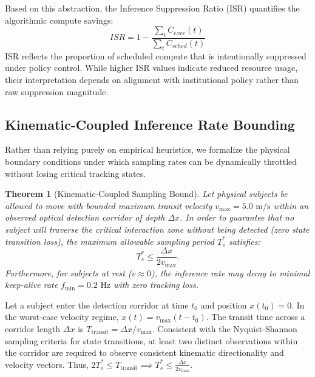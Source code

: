 \documentclass[conference]{IEEEtran}
\newtheorem{theorem}{Theorem}
\begin{document}
Based on this abstraction, the Inference Suppression Ratio (ISR) quantifies the algorithmic compute savings:
\begin{equation}
ISR = 1 - \frac{\sum_t C_{exec}(t)}{\sum_t C_{sched}(t)}
\end{equation}
ISR reflects the proportion of scheduled compute that is intentionally suppressed under policy control. While higher ISR values indicate reduced resource usage, their interpretation depends on alignment with institutional policy rather than raw suppression magnitude.

\subsection{Kinematic-Coupled Inference Rate Bounding}
Rather than relying purely on empirical heuristics, we formalize the physical boundary conditions under which sampling rates can be dynamically throttled without losing critical tracking states.

\begin{theorem}[Kinematic-Coupled Sampling Bound]
Let physical subjects be allowed to move with bounded maximum transit velocity $v_{\max} = 5.0\text{ m/s}$ within an observed optical detection corridor of depth $\Delta x$. In order to guarantee that no subject will traverse the critical interaction zone without being detected (zero state transition loss), the maximum allowable sampling period $T_s^*$ satisfies:
\begin{equation}
T_s^* \le \frac{\Delta x}{2 v_{\max}}.
\label{eq:kinematic_bound}
\end{equation}
Furthermore, for subjects at rest ($v \approx 0$), the inference rate may decay to minimal keep-alive rate $f_{\min} = 0.2\text{ Hz}$ with zero tracking loss.
\end{theorem}

\begin{IEEEproof}
Let a subject enter the detection corridor at time $t_0$ and position $x(t_0) = 0$. In the worst-case velocity regime, $x(t) = v_{\max} (t - t_0)$. The transit time across a corridor length $\Delta x$ is $T_{\text{transit}} = \Delta x / v_{\max}$. Consistent with the Nyquist-Shannon sampling criteria for state transitions, at least two distinct observations within the corridor are required to observe consistent kinematic directionality and velocity vectors. Thus, $2 T_s^* \le T_{\text{transit}} \implies T_s^* \le \frac{\Delta x}{2 v_{\max}}$.
\end{IEEEproof}
\end{document}
